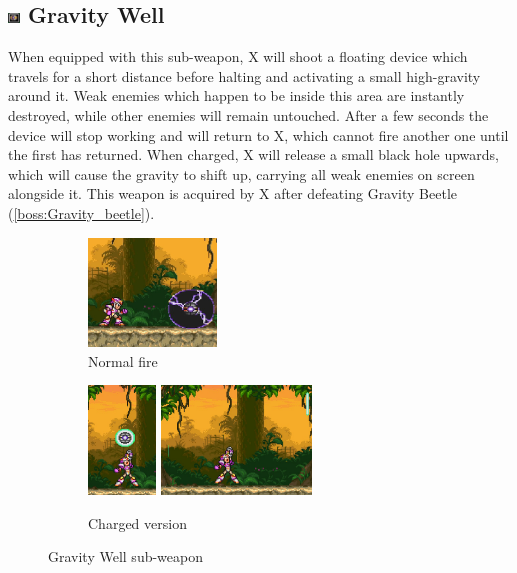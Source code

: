 \subsection{\includegraphics[width=12px, height=10px]{figures/X3/weapons/G_well.jpg} Gravity Well}\label{Gravity_Well}
When equipped with this sub-weapon, X will shoot a floating device which travels for a short distance before halting and activating a small high-gravity around it. Weak enemies which happen to be inside this area are instantly destroyed, while other enemies will remain untouched. After a few seconds the device will stop working and will return to X, which cannot fire another one until the first has returned. When charged, X will release a small black hole upwards, which will cause the gravity to shift up, carrying all weak enemies on screen alongside it. This weapon is acquired by X after defeating Gravity Beetle (\ref{boss:Gravity_beetle}). 
\begin{figure}[htp]
	\centering
	\begin{subfigure}{.28\linewidth}
		\centering
		\includegraphics[height=2.9cm]{figures/X3/weapons/G_well.png}
		\caption{Normal fire}	
	\end{subfigure}
	\begin{subfigure}{.6\linewidth}
		\centering
		\includegraphics[height=2.9cm]{figures/X3/weapons/G_well_C.png}
		\includegraphics[height=2.9cm]{figures/X3/weapons/G_well_C_1.png}
		\caption{Charged version}	
	\end{subfigure}
	\caption{Gravity Well sub-weapon}
\end{figure}
